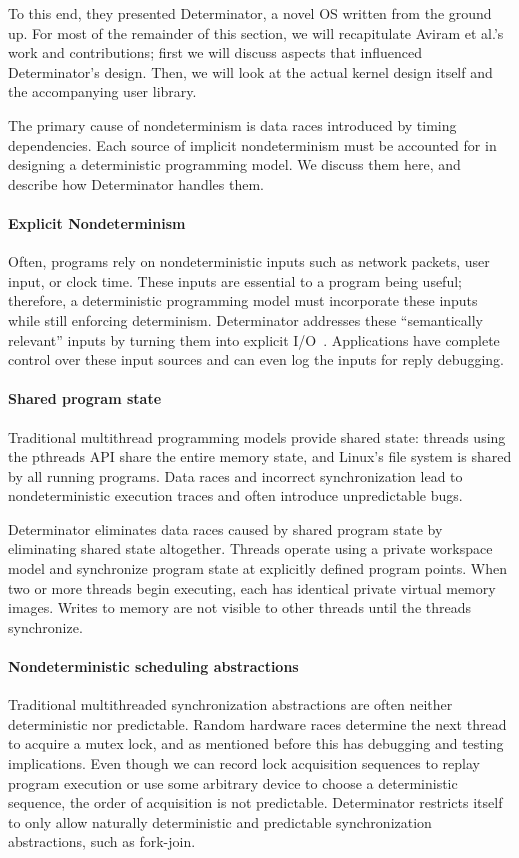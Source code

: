 To this end, they presented Determinator, a novel OS written from the ground up.
For most of the remainder of this section, we will recapitulate Aviram et al.'s
work and contributions; first we will discuss aspects that influenced
Determinator's design. Then, we will look at the actual kernel design itself
and the accompanying user library.

The primary cause of nondeterminism is data races introduced by timing
dependencies. Each source of implicit nondeterminism must be accounted for in
designing a deterministic programming model. We discuss them here, and describe
how Determinator handles them.

\paragraph{Explicit Nondeterminism}
Often, programs rely on nondeterministic inputs such as network packets, user
input, or clock time. These inputs are essential to a program being useful;
therefore, a deterministic programming model must incorporate these inputs while
still enforcing determinism. Determinator addresses these ``semantically
relevant'' inputs by turning them into explicit I/O~\cite{Aviram10}.
Applications have complete control over these input sources and can even log the
inputs for reply debugging.

\paragraph{Shared program state}
Traditional multithread programming models provide shared state: threads using
the pthreads API share the entire memory state, and Linux's file system is
shared by all running programs. Data races and incorrect synchronization lead
to nondeterministic execution traces and often introduce unpredictable bugs.

Determinator eliminates data races caused by shared program state by eliminating
shared state altogether. Threads operate using a private workspace model and
synchronize program state at explicitly defined program points. When two or more
threads begin executing, each has identical private virtual memory images.
Writes to memory are not visible to other threads until the threads synchronize.

\paragraph{Nondeterministic scheduling abstractions}
Traditional multithreaded synchronization abstractions are often neither
deterministic nor predictable. Random hardware races determine the next thread to
acquire a mutex lock, and as mentioned before this has debugging and testing
implications. Even though we can record lock acquisition sequences to replay
program execution or use some arbitrary device to choose a deterministic
sequence, the order of acquisition is not predictable. Determinator restricts
itself to only allow naturally deterministic and predictable synchronization
abstractions, such as fork-join.

